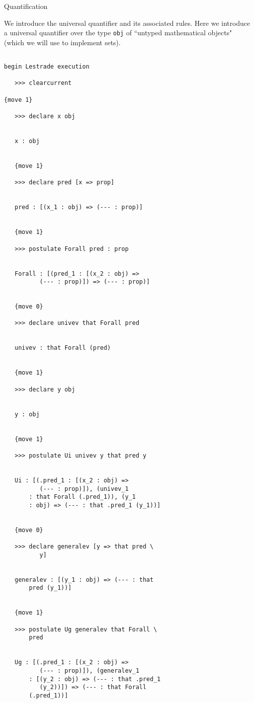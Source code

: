 \documentclass{slides}
\begin{document}
\begin{slide}

{\Large Quantification}

We introduce the universal quantifier and its associated rules.  Here we introduce a universal quantifier over the
type {\tt obj} of ``untyped mathematical objects" (which we will use to implement sets).

{\tiny

\begin{verbatim}

begin Lestrade execution

   >>> clearcurrent

{move 1}

   >>> declare x obj


   x : obj


   {move 1}

   >>> declare pred [x => prop]


   pred : [(x_1 : obj) => (--- : prop)]


   {move 1}

   >>> postulate Forall pred : prop


   Forall : [(pred_1 : [(x_2 : obj) => 
          (--- : prop)]) => (--- : prop)]


   {move 0}

   >>> declare univev that Forall pred


   univev : that Forall (pred)


   {move 1}

   >>> declare y obj


   y : obj


   {move 1}

   >>> postulate Ui univev y that pred y


   Ui : [(.pred_1 : [(x_2 : obj) => 
          (--- : prop)]), (univev_1 
       : that Forall (.pred_1)), (y_1 
       : obj) => (--- : that .pred_1 (y_1))]


   {move 0}

   >>> declare generalev [y => that pred \
          y]


   generalev : [(y_1 : obj) => (--- : that 
       pred (y_1))]


   {move 1}

   >>> postulate Ug generalev that Forall \
       pred


   Ug : [(.pred_1 : [(x_2 : obj) => 
          (--- : prop)]), (generalev_1 
       : [(y_2 : obj) => (--- : that .pred_1 
          (y_2))]) => (--- : that Forall 
       (.pred_1))]



\end{verbatim}}
\end{slide}
\end{document}
